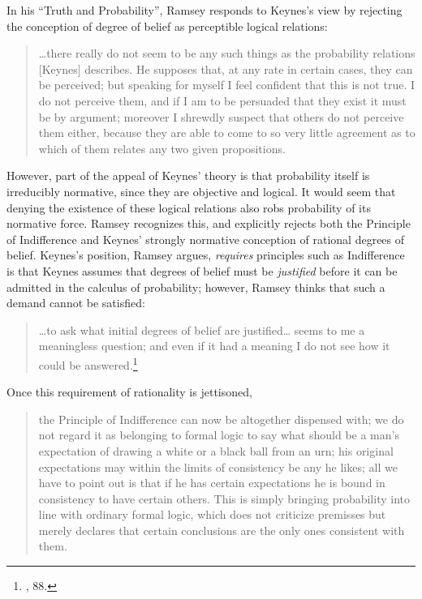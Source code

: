 In his ``Truth and Probability'', Ramsey responds to Keynes's view by
rejecting the conception of degree of belief as perceptible logical
relations:

\begin{quote}
\ldots{}there really do not seem to be any such things as the
probability relations {[}Keynes{]} describes. He supposes that, at any
rate in certain cases, they can be perceived; but speaking for myself I
feel confident that this is not true. I do not perceive them, and if I
am to be persuaded that they exist it must be by argument; moreover I
shrewdly suspect that others do not perceive them either, because they
are able to come to so very little agreement as to which of them relates
any two given propositions.
\end{quote}

However, part of the appeal of Keynes' theory is that probability itself
is irreducibly normative, since they are objective and logical. It would seem that denying the existence of these logical relations also robs probability of its normative force. Ramsey recognizes this, and explicitly rejects both the Principle of Indifference and Keynes' strongly normative conception of rational degrees of belief. Keynes's position, Ramsey argues, \emph{requires} principles such as Indifference is that Keynes assumes that degrees of belief must be \emph{justified} before it can be admitted in the calculus of probability; however, Ramsey thinks that such a demand cannot be satisfied:

\begin{quote}
\ldots{}to ask what initial degrees of belief are justified\ldots{}
seems to me a meaningless question; and even if it had a meaning I do
not see how it could be answered.\footnote{\cite{ramsey}, 88.}
\end{quote}

Once this requirement of rationality is jettisoned,

\begin{quote}
the Principle of Indifference can now be altogether dispensed with; we
do not regard it as belonging to formal logic to say what should be a
man's expectation of drawing a white or a black ball from an urn; his
original expectations may within the limits of consistency be any he
likes; all we have to point out is that if he has certain expectations
he is bound in consistency to have certain others. This is simply
bringing probability into line with ordinary formal logic, which does
not criticize premisses but merely declares that certain conclusions are
the only ones consistent with them.
\end{quote}


